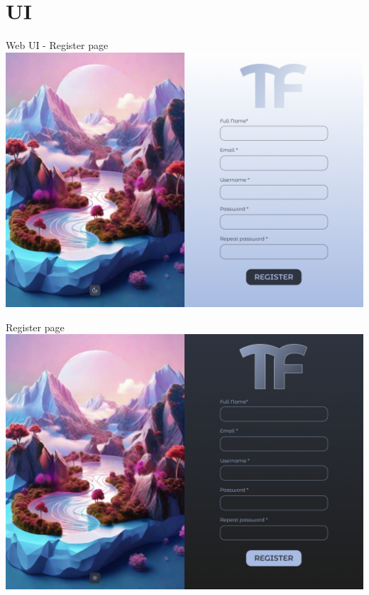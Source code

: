 \documentclass{beamer}
\begin{document}
\section{UI}
\begin{frame}{Web UI - Register page}
    \includegraphics[width=\linewidth]{assets/ui/register-light.png} 
\end{frame}
\begin{frame}{Register page}
    \includegraphics[width=\linewidth]{assets/ui/register.png} 
\end{frame}
\end{document}
